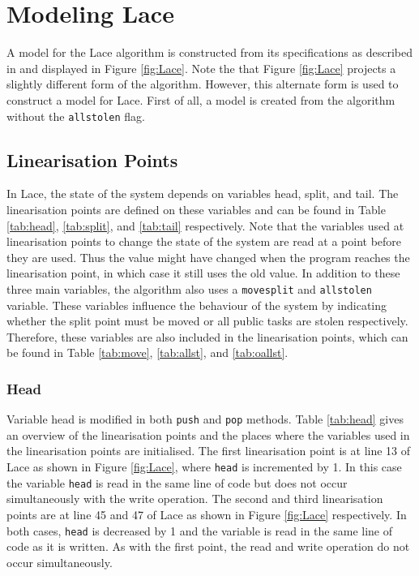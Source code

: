 \documentclass{sig-alternate-br}
\begin{document}
\section{Modeling Lace}
A model for the Lace algorithm is constructed from its specifications as described in \cite{vanDijk2014206} and displayed in Figure \ref{fig:Lace}.
Note the that Figure \ref{fig:Lace} projects a slightly different form of the algorithm.
However, this alternate form is used to construct a model for Lace.
First of all, a model is created from the algorithm without the \texttt{allstolen} flag.

\subsection{Linearisation Points}
In Lace, the state of the system depends on variables head, split, and tail.
The linearisation points are defined on these variables and can be found in Table \ref{tab:head}, \ref{tab:split}, and \ref{tab:tail} respectively.
Note that the variables used at linearisation points to change the state of the system are read at a point before they are used.
Thus the value might have changed when the program reaches the linearisation point, in which case it still uses the old value.
In addition to these three main variables, the algorithm also uses a \texttt{movesplit} and \texttt{allstolen} variable.
These variables influence the behaviour of the system by indicating whether the split point must be moved or all public tasks are stolen respectively.
Therefore, these variables are also included in the linearisation points, which can be found in Table \ref{tab:move}, \ref{tab:allst}, and \ref{tab:oallst}.

\subsubsection{Head}
\label{sec:head}
Variable head is modified in both \texttt{push} and \texttt{pop} methods.
Table \ref{tab:head} gives an overview of the linearisation points and the places where the variables used in the linearisation points are initialised.
The first linearisation point is at line 13 of Lace as shown in Figure \ref{fig:Lace}, where \texttt{head} is incremented by 1.
In this case the variable \texttt{head} is read in the same line of code but does not occur simultaneously with the write operation.
The second and third linearisation points are at line 45 and 47 of Lace as shown in Figure \ref{fig:Lace} respectively.
In both cases, \texttt{head} is decreased by 1 and the variable is read in the same line of code as it is written.
As with the first point, the read and write operation do not occur simultaneously.
\end{document}
